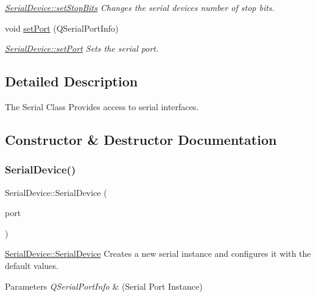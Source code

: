\begin{DoxyCompactItemize}
\begin{DoxyCompactList}\small\item\em \hyperlink{class_serial_device_a95b44d8167ae0a6a025ba9c4f2d5ee47}{Serial\+Device\+::set\+Stop\+Bits} Changes the serial device\textquotesingle{}s number of stop bits. \end{DoxyCompactList}\item 
void \hyperlink{class_serial_device_a1440b389cc1bba66e9854a32a5807a8f}{set\+Port} (Q\+Serial\+Port\+Info)
\begin{DoxyCompactList}\small\item\em \hyperlink{class_serial_device_a1440b389cc1bba66e9854a32a5807a8f}{Serial\+Device\+::set\+Port} Sets the serial port. \end{DoxyCompactList}\end{DoxyCompactItemize}


\subsection{Detailed Description}
The Serial Class Provides access to serial interfaces. 

\subsection{Constructor \& Destructor Documentation}
\hypertarget{class_serial_device_aa0b6d87aea8d882096abe85fda113b26}{}\label{class_serial_device_aa0b6d87aea8d882096abe85fda113b26} 
\subsubsection{\texorpdfstring{Serial\+Device()}{SerialDevice()}\hspace{0.1cm}{\footnotesize\ttfamily [1/2]}}
{\footnotesize\ttfamily Serial\+Device\+::\+Serial\+Device (\begin{DoxyParamCaption}\item[{Q\+Serial\+Port\+Info}]{port }\end{DoxyParamCaption})}



\hyperlink{class_serial_device_aad126bede3b0adf49e1fbe3afd7c6c42}{Serial\+Device\+::\+Serial\+Device} Creates a new serial instance and configures it with the default values. 


\begin{DoxyParams}{Parameters}
{\em Q\+Serial\+Port\+Info} & (Serial Port Instance) \\
\hline
\end{DoxyParams}
\hypertarget{class_serial_device_a070f0759c102570004f1c5e1feb31abe}{}\label{class_serial_device_a070f0759c102570004f1c5e1feb31abe} 

